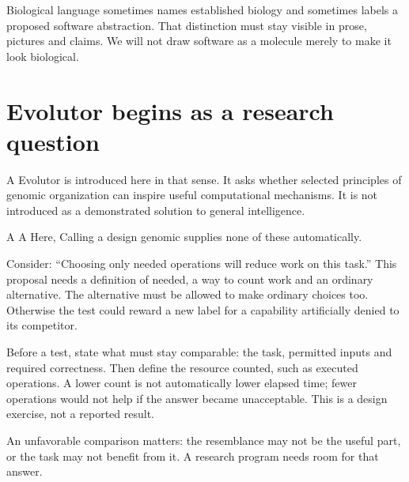 Biological language sometimes names established biology and sometimes labels a proposed software abstraction. That distinction must stay visible in prose, pictures and claims. We will not draw software as a molecule merely to make it look biological.

\clearpage
\section{Evolutor begins as a research question}\label{sec:research}
A  Evolutor is introduced here in that sense. It asks whether selected principles of genomic organization can inspire useful computational mechanisms. It is not introduced as a demonstrated solution to general intelligence.

A  A  Here,  Calling a design genomic supplies none of these automatically.

Consider: “Choosing only needed operations will reduce work on this task.” This proposal needs a definition of needed, a way to count work and an ordinary alternative. The alternative must be allowed to make ordinary choices too. Otherwise the test could reward a new label for a capability artificially denied to its competitor.

Before a test, state what must stay comparable: the task, permitted inputs and required correctness. Then define the resource counted, such as executed operations. A lower count is not automatically lower elapsed time; fewer operations would not help if the answer became unacceptable. This is a design exercise, not a reported result.

An unfavorable comparison matters: the resemblance may not be the useful part, or the task may not benefit from it. A research program needs room for that answer.

